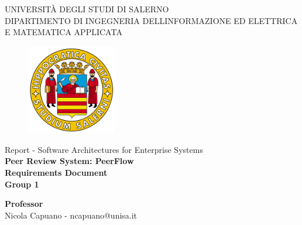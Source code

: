 \begin{titlepage}
    \begin{center}
        \LARGE{\uppercase{Università degli Studi di Salerno}}\\
        \vspace{5mm}
    	\uppercase{\normalsize Dipartimento di Ingegneria dell\textquotesingle Informazione ed Elettrica e Matematica applicata}\\
    \end{center}
    
    \vspace{2mm}
    \begin{figure}[H]
        \centering
        \includegraphics[width=0.35\textwidth]{logo_unisa}
    \end{figure}
    \vspace{2mm}
    
    \begin{center}
    	\normalsize{Report - Software Architectures for Enterprise Systems}\\
    	\vspace{10mm}
        {\huge{\bf Peer Review System: PeerFlow}}\\
        \vspace{2mm}
        {\LARGE{\bf Requirements Document}}\\
        \vspace{2mm}
        {\normalsize{\bf Group 1}}
    \end{center}
    
    \vspace{10mm}
    \noindent
    \begin{center}
            \textbf{Professor}\\
            \vspace{2mm}
            Nicola Capuano - ncapuano@unisa.it
    \end{center}
    
    \vspace{12mm} %
    

\end{titlepage}
